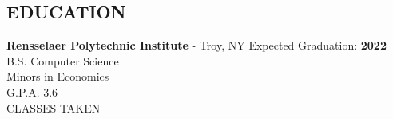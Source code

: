 \documentclass{res}
\begin{document}
 


\address{\bf  ADDRESS\\11 Riverside Drive APT 7WE\\New York, NY 10023}
\address{\bf Contact Info \\ eli@elischiff.org \\   (646) 574-5224}
                                  
\begin{resume}


\section{EDUCATION}          
    {\bf Rensselaer Polytechnic Institute} - Troy, NY \hfill Expected Graduation: {\bf 2022} \\        
    B.S. Computer Science   \\    
    Minors in Economics  \\        
    G.P.A. 3.6 \\
    CLASSES TAKEN

 

\end{resume}
\end{document}
